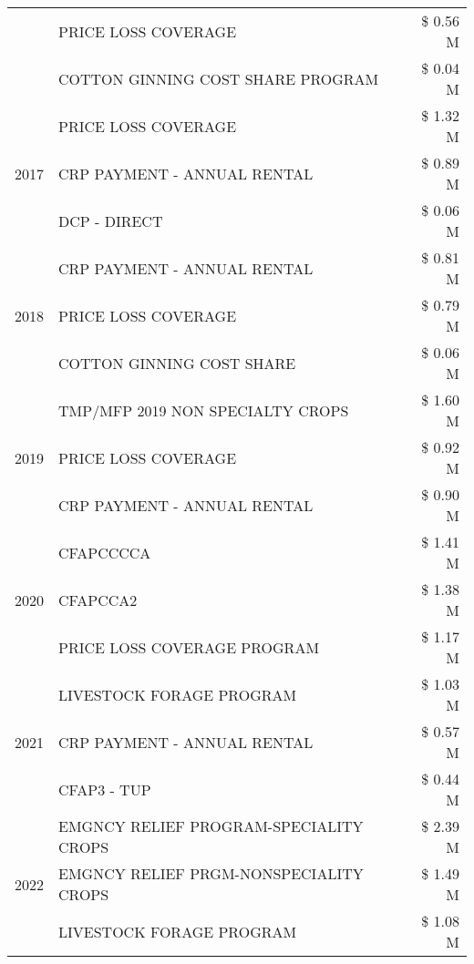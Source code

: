 \begin{tabular}{llr}
 & PRICE LOSS COVERAGE & \$ 0.56 M \\
 & COTTON GINNING COST SHARE PROGRAM & \$ 0.04 M \\
\cline{1-3}
\multirow[t]{3}{*}{2017} & PRICE LOSS COVERAGE & \$ 1.32 M \\
 & CRP PAYMENT - ANNUAL RENTAL & \$ 0.89 M \\
 & DCP - DIRECT & \$ 0.06 M \\
\cline{1-3}
\multirow[t]{3}{*}{2018} & CRP PAYMENT - ANNUAL RENTAL & \$ 0.81 M \\
 & PRICE LOSS COVERAGE & \$ 0.79 M \\
 & COTTON GINNING COST SHARE & \$ 0.06 M \\
\cline{1-3}
\multirow[t]{3}{*}{2019} & TMP/MFP 2019 NON SPECIALTY CROPS & \$ 1.60 M \\
 & PRICE LOSS COVERAGE & \$ 0.92 M \\
 & CRP PAYMENT - ANNUAL RENTAL & \$ 0.90 M \\
\cline{1-3}
\multirow[t]{3}{*}{2020} & CFAPCCCCA & \$ 1.41 M \\
 & CFAPCCA2 & \$ 1.38 M \\
 & PRICE LOSS COVERAGE PROGRAM & \$ 1.17 M \\
\cline{1-3}
\multirow[t]{3}{*}{2021} & LIVESTOCK FORAGE PROGRAM & \$ 1.03 M \\
 & CRP PAYMENT - ANNUAL RENTAL & \$ 0.57 M \\
 & CFAP3 - TUP & \$ 0.44 M \\
\cline{1-3}
\multirow[t]{3}{*}{2022} & EMGNCY RELIEF PROGRAM-SPECIALITY CROPS & \$ 2.39 M \\
 & EMGNCY RELIEF PRGM-NONSPECIALITY CROPS & \$ 1.49 M \\
 & LIVESTOCK FORAGE PROGRAM & \$ 1.08 M \\
\cline{1-3}
\bottomrule
\end{tabular}
